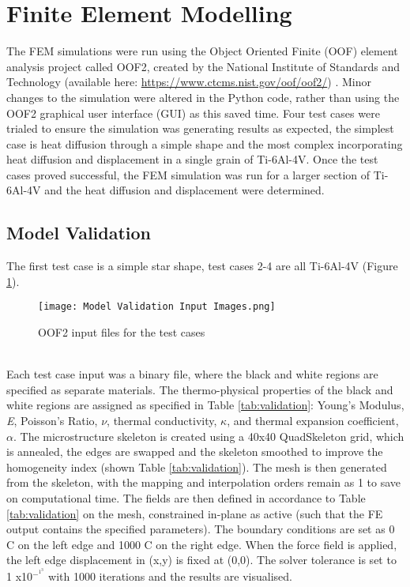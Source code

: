 \documentclass[report.tex]{subfiles}
\begin{document}
\section{Finite Element Modelling}
The FEM simulations were run using the Object Oriented Finite (OOF) element analysis project called OOF2, created by the National Institute of Standards and Technology (available here: \url{https://www.ctcms.nist.gov/oof/oof2/}) \cite{OOF2Modelling}. Minor changes to the simulation were altered in the Python code, rather than using the OOF2 graphical user interface (GUI) as this saved time. Four test cases were trialed to ensure the simulation was generating results as expected, the simplest case is heat diffusion through a simple shape and the most complex incorporating heat diffusion and displacement in a single grain of Ti-6Al-4V. Once the test cases proved successful, the FEM simulation was run for a larger section of Ti-6Al-4V and the heat diffusion and displacement were determined.

\subsection{Model Validation}
The first test case is a simple star shape, test cases 2-4 are all Ti-6Al-4V (Figure \ref{fig:OOF2Input}).
\\
\begin{figure}[h]
    \centering
    \texttt{[image: Model Validation Input Images.png]}
    \caption{OOF2 input files for the test cases}
    \label{fig:OOF2Input}
\end{figure}
\\
Each test case input was a binary file, where the black and white regions are specified as separate materials. The thermo-physical properties of the black and white regions are assigned as specified in Table \ref{tab:validation}: Young's Modulus, \textit{E}, Poisson's Ratio, $\nu$, thermal conductivity, $\kappa$, and thermal expansion coefficient, $\alpha$. The microstructure skeleton is created using a 40x40 QuadSkeleton grid, which is annealed, the edges are swapped and the skeleton smoothed to improve the homogeneity index (shown Table \ref{tab:validation}). The mesh is then generated from the skeleton, with the mapping and interpolation orders remain as 1 to save on computational time. The fields are then defined in accordance to Table \ref{tab:validation} on the mesh, constrained in-plane as active (such that the FE output contains the specified parameters). The boundary conditions are set as 0 \degree C on the left edge and 1000 \degree C on the right edge. When the force field is applied, the left edge displacement in (x,y) is fixed at (0,0). The solver tolerance is set to 1 x10$^-^1^3$ with 1000 iterations and the results are visualised.
\end{document}
